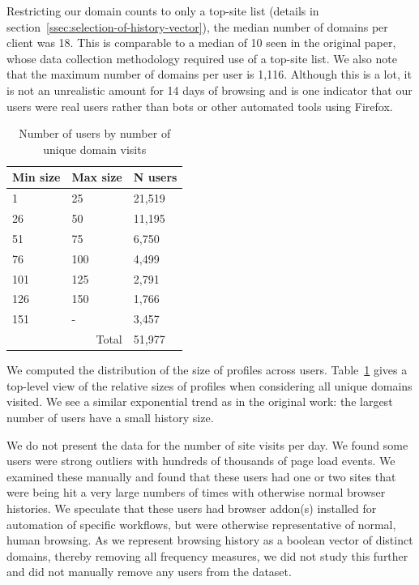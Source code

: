 \documentclass[letterpaper,twocolumn,10pt]{article}
\begin{document}
Restricting our domain counts to only a top-site list (details in section~\ref{ssec:selection-of-history-vector}), the median number of domains per client was 18. This is comparable to a median of 10 seen in the original paper, whose data collection methodology required use of a top-site list.
We also note that the maximum number of domains per user is 1,116. 
Although this is a lot, it is not an unrealistic amount for 14 days of browsing and is one indicator that our users were real users rather than bots or other automated tools using Firefox.

\begin{table}[hbtp]
\centering
 \begin{tabular}{@{}lll@{}}
\toprule
Min size & Max size                  & N users \\ \midrule
1        & 25                        & 21,519  \\
26       & 50                        & 11,195  \\
51       & 75                        & 6,750   \\
76       & 100                       & 4,499   \\
101      & 125                       & 2,791   \\
126      & 150                       & 1,766   \\
151      & -                    & 3,457   \\ \midrule
         & \multicolumn{1}{r}{Total} & 51,977 
\end{tabular}
\caption{Number of users by number of unique domain visits}
\label{table:profile-size-n}
\end{table}

We computed the distribution of the size of profiles across users. Table~\ref{table:profile-size-n} gives a top-level view of the relative sizes of profiles when considering all unique domains visited. 
We see a similar exponential trend as in the original work: the largest number of users have a small history size. 

We do not present the data for the number of site visits per day. 
We found some users were strong outliers with hundreds of thousands of page load events. 
We examined these manually and found that these users had one or two sites that were being hit a very large numbers of times with otherwise normal browser histories. 
We speculate that these users had browser addon(s) installed for automation of specific workflows, but were otherwise representative of normal, human browsing. 
As we represent browsing history as a boolean vector of distinct domains, thereby removing all frequency measures, we did not study this further and did not manually remove any users from the dataset.
\end{document}
